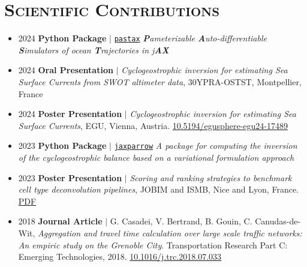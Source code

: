 \documentclass{article}
\begin{document}
\section*{\textsc{Scientific Contributions}}
\begin{itemize}
    \item[] 2024 \tabto{2cm} \textbf{Python Package} $\vert$ \href{https://github.com/vadmbertr/pastax}{\texttt{pastax}} \textit{\textbf{P}ameterizable \textbf{A}uto-differentiable \textbf{S}imulators of ocean \textbf{T}rajectories in j\textbf{AX}}
    
    \item[] 2024 \tabto{2cm} \textbf{Oral Presentation} $\vert$ \textit{Cyclogeostrophic inversion for estimating Sea Surface Currents from SWOT \tabto{2cm} altimeter data}, 30YPRA-OSTST, Montpellier, France
    
    \item[] 2024 \tabto{2cm} \textbf{Poster Presentation} $\vert$ \textit{Cyclogeostrophic inversion for estimating Sea Surface Currents}, EGU, Vienna, \tabto{2cm} Austria. \href{https://doi.org/10.5194/egusphere-egu24-17489}{10.5194/egusphere-egu24-17489}
    
    \item[] 2023 \tabto{2cm} \textbf{Python Package} $\vert$ \href{https://github.com/meom-group/jaxparrow}{\texttt{jaxparrow}} \textit{A package for computing the inversion of the cyclogeostrophic balance based \tabto{2cm} on a variational formulation approach}
    
    \item[] 2023 \tabto{2cm} \textbf{Poster Presentation} $\vert$ \textit{Scoring and ranking strategies to benchmark cell type deconvolution pipelines}, \tabto{2cm} JOBIM and ISMB, Nice and Lyon, France. \href{https://vadmbertr.github.io/Exploration-of-joint-deconvolution-algorithms-for-omic-data/poster_jobim_ismb.pdf}{PDF}
    
    \item[] 2018 \tabto{2cm} \textbf{Journal Article} $\vert$ G. Casadei, V. Bertrand, B. Gouin, C. Canudas-de-Wit, \textit{Aggregation and travel time \tabto{2cm} calculation over large scale traffic networks: An empiric study on the Grenoble City}. Transportation \tabto{2cm} Research Part C: Emerging Technologies, 2018. \href{https://doi.org/10.1016/j.trc.2018.07.033}{10.1016/j.trc.2018.07.033}
\end{itemize}
\end{document}
